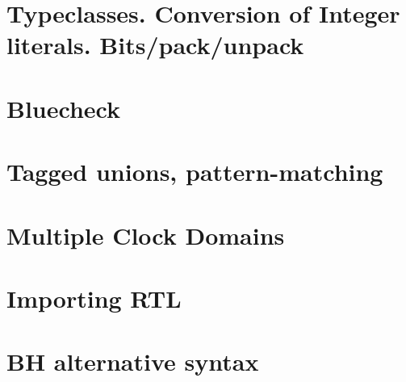 \section{Typeclasses. Conversion of Integer literals. Bits/pack/unpack}

\label{Sec_Typeclasses}


\section{Bluecheck}


\section{Tagged unions, pattern-matching}


\section{Multiple Clock Domains}


\section{Importing RTL}


\section{BH alternative syntax}

